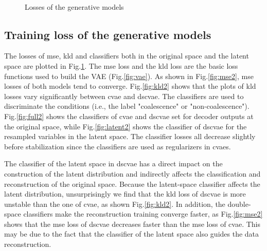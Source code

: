 \documentclass[twoside,twocolumn,9pt]{article}
\begin{document}
\begin{figure}[h]
    \centering
    \\
    \caption{Losses of the generative models}
    \label{fig:loss2}
\end{figure}



\subsection{Training loss of the generative models} 
The losses of \acrshort*{mse}, \acrshort*{kld} and classifiers both in the original space and the latent space are plotted in Fig.\ref{fig:loss2}. 
The \acrshort*{mse} loss and the \acrshort*{kld} loss are the basic loss functions used to build the VAE (Fig.\ref{fig:vae}). As shown in Fig.\ref{fig:mse2}, \acrshort*{mse} losses of both models tend to converge. Fig.\ref{fig:kld2} shows that the plots of \acrshort*{kld} losses vary significantly between \acrshort*{cvae} and \acrshort*{dscvae}.  The classifiers are used to discriminate the conditions (i.e., the label "coalescence" or "non-coalescence"). Fig.\ref{fig:full2} shows the classifiers of \acrshort*{cvae} and \acrshort*{dscvae} set for decoder outputs at the original space, while Fig.\ref{fig:latent2} shows the classifier of \acrshort*{dscvae} for the resampled variables in the latent space. The classifier losses  all decrease slightly before stabilization since the classifiers are used as regularizers in \acrshort*{cvae}s. 

The classifier of the latent space in \acrshort*{dscvae} has a direct impact on the construction of the latent distribution and indirectly affects the classification and reconstruction of the original space. Because the latent-space classifier affects the latent distribution, unsurprisingly we find that the \acrshort*{kld} loss of \acrshort*{dscvae} is more unstable than the one of \acrshort*{cvae}, as shown Fig.\ref{fig:kld2}. In addition, the double-space classifiers make the reconstruction training converge faster, as Fig.\ref{fig:mse2} shows that the \acrshort*{mse} loss of \acrshort*{dscvae} decreases faster than the \acrshort*{mse} loss of \acrshort*{cvae}. This may be due to the fact that the classifier of the latent space also guides the data reconstruction.
\end{document}
